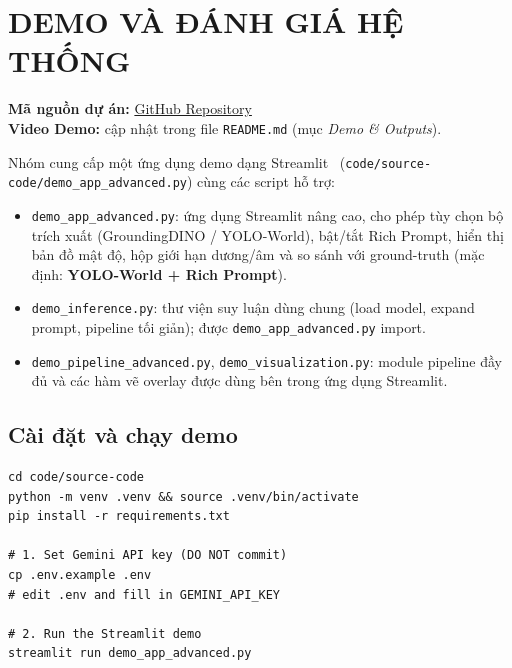 \documentclass[a4paper,12pt]{report}
\numberwithin{figure}{chapter}
\numberwithin{table}{chapter}
\begin{document}
\chapter{DEMO VÀ ĐÁNH GIÁ HỆ THỐNG}
\label{ch:demo}

\begin{flushleft}
    \textbf{Mã nguồn dự án:} \href{https://github.com/paht2005/CS338.Q21_Zero-shot-Object-Coutning-with-Good-Examplers}{GitHub Repository} \\
    \textbf{Video Demo:} cập nhật trong file \texttt{README.md} (mục \emph{Demo \& Outputs}).
\end{flushleft}
Nhóm cung cấp một ứng dụng demo dạng Streamlit~\cite{streamlit} (\texttt{code/source-code/demo\_app\_advanced.py}) cùng các script hỗ trợ:

\begin{itemize}
    \item \texttt{demo\_app\_advanced.py}: ứng dụng Streamlit nâng cao, cho phép tùy chọn bộ trích xuất (GroundingDINO / YOLO-World), bật/tắt Rich Prompt, hiển thị bản đồ mật độ, hộp giới hạn dương/âm và so sánh với ground-truth (mặc định: \textbf{YOLO-World + Rich Prompt}).
    \item \texttt{demo\_inference.py}: thư viện suy luận dùng chung (load model, expand prompt, pipeline tối giản); được \texttt{demo\_app\_advanced.py} import.
    \item \texttt{demo\_pipeline\_advanced.py}, \texttt{demo\_visualization.py}: module pipeline đầy đủ và các hàm vẽ overlay được dùng bên trong ứng dụng Streamlit.
\end{itemize}

\section{Cài đặt và chạy demo}

\begin{lstlisting}[style=bashstyle]
cd code/source-code
python -m venv .venv && source .venv/bin/activate
pip install -r requirements.txt

# 1. Set Gemini API key (DO NOT commit)
cp .env.example .env
# edit .env and fill in GEMINI_API_KEY

# 2. Run the Streamlit demo
streamlit run demo_app_advanced.py
\end{lstlisting}
\end{document}
